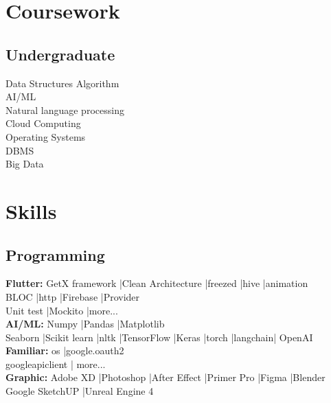 \documentclass[]{resume}
\begin{document}
\begin{minipage}[t]{0.33\textwidth}
    \section{Coursework}
    \subsection{Undergraduate}
    Data Structures Algorithm\\
    AI/ML\\
    Natural language processing\\
    Cloud Computing\\
    Operating Systems\\
    DBMS\\
    Big Data\\
    \sectionsep


    \section{Skills}
    \subsection{Programming}
    \textbf{Flutter: }GetX framework |Clean
    Architecture |freezed |hive |animation\\BLOC |http |Firebase |Provider \\Unit test |Mockito |more...\\
    \textbf{AI/ML: }Numpy |Pandas |Matplotlib\\Seaborn |Scikit learn |nltk |TensorFlow |Keras |torch |langchain| OpenAI\\
    \textbf{Familiar: }os |google.oauth2\\googleapiclient | more...\\
    \textbf{Graphic: }Adobe XD |Photoshop |After Effect |Primer Pro |Figma |Blender\\Google SketchUP |Unreal Engine 4\\


\end{minipage}
\hfill
\end{document}
